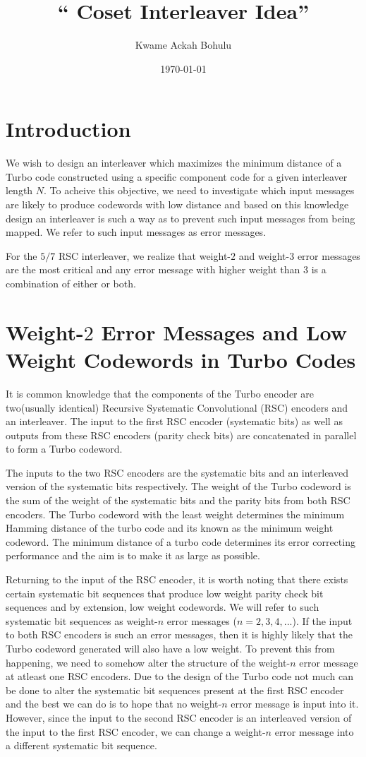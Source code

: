 \documentclass[11pt, oneside, dvipdfmx]{book}
\title{``
Coset Interleaver Idea'' }
\author{Kwame Ackah Bohulu}
\date{\today}
\begin{document}
\maketitle




\section{Introduction}
We wish to design an interleaver which maximizes the minimum distance of a Turbo code constructed using a specific component code for a given interleaver length $N$. To acheive this objective, we need to investigate which input messages are likely to produce codewords with low distance and based on this knowledge design an interleaver is such a way as to prevent such input messages from being mapped. We refer to such input messages as error messages.

 For the $5/7$ RSC interleaver, we realize that weight-$2$ and weight-$3$ error messages are the most critical and any error message with higher weight than $3$ is a combination of either or both.
 
 
 \section{Weight-$2$ Error Messages and Low Weight Codewords in Turbo Codes}
 It is common knowledge that the components of the Turbo encoder are two(usually identical) Recursive Systematic Convolutional (RSC) encoders and an interleaver. The input to the first RSC encoder (systematic bits) as well as outputs from these RSC encoders (parity check bits) are concatenated in parallel to form a Turbo codeword.
 
 The inputs to the two RSC encoders are the systematic bits and an interleaved version of the systematic bits respectively. The weight of the Turbo codeword is the sum of the weight of the systematic bits and the parity bits from both RSC encoders. The Turbo codeword with the least weight determines the minimum Hamming distance of the turbo code and its known as the minimum weight codeword. The minimum distance of a turbo code determines its error correcting performance and the aim is to make it as large as possible.
 
 Returning to the input of the RSC encoder, it is worth noting that there exists certain systematic bit sequences that produce low weight parity check bit sequences and by extension, low weight codewords. We will refer to such systematic bit sequences as weight-$n$ error messages ($n=2,3,4,...$). If the input to both RSC encoders is such an error messages, then it is highly likely that the Turbo codeword generated will also have a low weight. To prevent this from happening, we need to somehow alter the structure of the weight-$n$ error message at atleast one RSC encoders. Due to the design of the Turbo code not much can be done to alter the systematic bit sequences present at the first RSC encoder and the best we can do is to hope that no weight-$n$ error message is input into it. However, since the input to the second RSC encoder is an interleaved version of the input to the first RSC encoder, we can change a weight-$n$ error message into a different systematic bit sequence.
 
\end{document}
